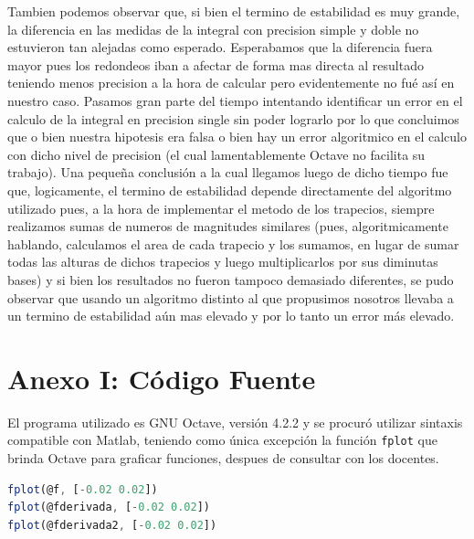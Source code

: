 \documentclass[11pt,a4paper]{article}
\begin{document}
Tambien podemos observar que, si bien el termino de estabilidad es muy grande, la diferencia en las medidas de la integral con precision simple y doble no estuvieron tan alejadas como esperado. Esperabamos que la diferencia fuera mayor pues los redondeos iban a afectar de forma mas directa al resultado teniendo menos precision a la hora de calcular pero evidentemente no fué así en nuestro caso. Pasamos gran parte del tiempo intentando identificar un error en el calculo de la integral en precision single sin poder lograrlo por lo que concluimos que o bien nuestra hipotesis era falsa o bien hay un error algoritmico en el calculo con dicho nivel de precision (el cual lamentablemente Octave no facilita su trabajo). Una pequeña conclusión a la cual llegamos luego de dicho tiempo fue que, logicamente, el termino de estabilidad depende directamente del algoritmo utilizado pues, a la hora de implementar el metodo de los trapecios, siempre realizamos sumas de numeros de magnitudes similares (pues, algoritmicamente hablando, calculamos el area de cada trapecio y los sumamos, en lugar de sumar todas las alturas de dichos trapecios y luego multiplicarlos por sus diminutas bases) y si bien los resultados no fueron tampoco demasiado diferentes, se pudo observar que usando un algoritmo distinto al que propusimos nosotros llevaba a un termino de estabilidad aún mas elevado y por lo tanto un error más elevado.

\newpage
\appendix
\section{Anexo I: Código Fuente}

El programa utilizado es GNU Octave, versión 4.2.2 y se procuró utilizar sintaxis compatible con Matlab, teniendo como única excepción la función \texttt{fplot} que brinda Octave para graficar funciones, despues de consultar con los docentes.



\newpage


\newpage


\newpage
\begin{lstlisting}[language=Octave,title=Generación de graficos]
fplot(@f, [-0.02 0.02])
fplot(@fderivada, [-0.02 0.02])
fplot(@fderivada2, [-0.02 0.02])
\end{lstlisting}
\end{document}
